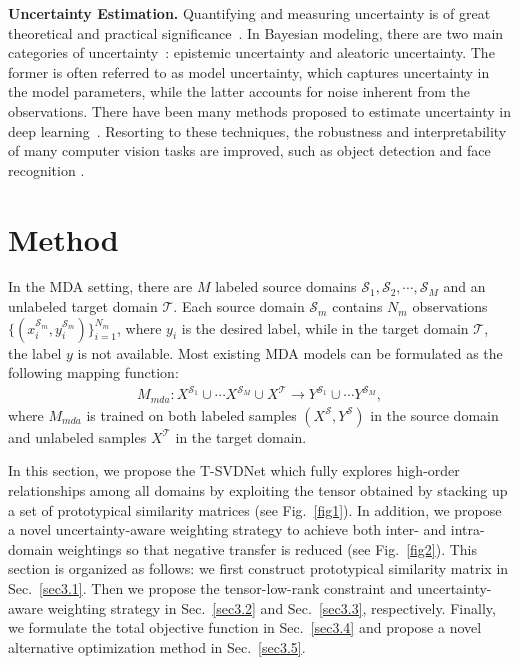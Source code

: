 \documentclass[10pt,twocolumn,letterpaper]{article}
\begin{document}
\textbf{Uncertainty Estimation.} 
Quantifying and measuring uncertainty is of great theoretical and practical significance~\cite{faber2005on,kiureghian2009aleatory}. In Bayesian modeling, there are two main categories of uncertainty~\cite{kendall2017what}: epistemic uncertainty and aleatoric uncertainty. The former is often referred to as model uncertainty, which captures uncertainty in the model parameters, while the latter accounts for noise inherent from the observations. There have been many methods proposed to estimate uncertainty in deep learning~\cite{blundell2015weight,gal2016dropout,cipolla2018multi}. Resorting to these techniques, the robustness and interpretability of many computer vision tasks are improved, such as object detection \cite{choi2019gaussian,kraus2019uncertainty} and face recognition \cite{chang2020data}.        
\section{Method}
In the MDA setting, there are $M$ labeled source domains ${\mathcal{S}}_1, {\mathcal{S}}_2, \cdots, {\mathcal{S}}_M$ and an unlabeled target domain ${\mathcal{T}}$. Each source domain ${\mathcal{S}}_m$ contains $N_m$ observations $\{({x}_{i}^{\mathcal{S}_m}, {y}_{i}^{\mathcal{S}_m})\}_{i=1}^{N_m} $, where $y_{i}$ is the desired label, while in the target domain ${\mathcal{T}}$, the label $y$ is not available. Most existing MDA models can be formulated as the following mapping function:
\begin{align}
	M_{mda}: X^{{\mathcal{S}}_1}\cup \cdots X^{{\mathcal{S}}_M} \cup X^{\mathcal{T}}\rightarrow Y^{{\mathcal{S}}_1}\cup\cdots Y^{{\mathcal{S}}_M},
\end{align}
where $M_{mda}$ is trained on both labeled samples $(X^{\mathcal{S}}, Y^{\mathcal{S}})$ in the source domain and unlabeled samples $X^{\mathcal{T}}$ in the target domain. \par
In this section, we propose the T-SVDNet which fully explores high-order relationships among all domains by exploiting the tensor obtained by stacking up a set of prototypical similarity matrices (see Fig.~\ref{fig1}). In addition, we propose a novel uncertainty-aware weighting strategy to achieve both inter- and intra-domain weightings so that negative transfer is reduced (see Fig.~\ref{fig2}). This section is organized as follows: we first construct prototypical similarity matrix in Sec.~\ref{sec3.1}. Then we propose the tensor-low-rank constraint and uncertainty-aware weighting strategy in Sec.~\ref{sec3.2} and Sec.~\ref{sec3.3}, respectively. Finally, we formulate the total objective function in Sec.~\ref{sec3.4} and propose a novel alternative optimization method in Sec.~\ref{sec3.5}.
\end{document}
